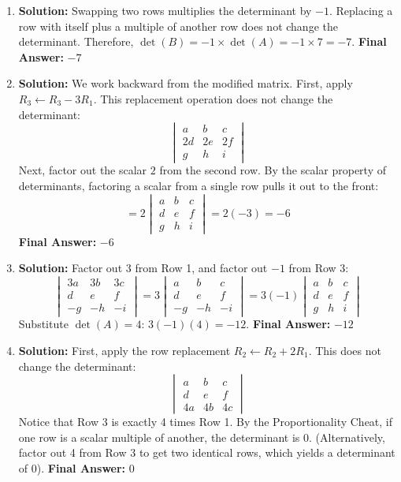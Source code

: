 \documentclass[11pt]{article}
\begin{document}
\begin{enumerate}
    \item \textbf{Solution:} Swapping two rows multiplies the determinant by $-1$. Replacing a row with itself plus a multiple of another row does not change the determinant.
    Therefore, $\det(B) = -1 \times \det(A) = -1 \times 7 = -7$.
    \textbf{Final Answer:} $-7$

    \item \textbf{Solution:} We work backward from the modified matrix.
    First, apply $R_3 \leftarrow R_3 - 3R_1$. This replacement operation does not change the determinant:
    \[ \begin{vmatrix} a & b & c \\ 2d & 2e & 2f \\ g & h & i \end{vmatrix} \]
    Next, factor out the scalar $2$ from the second row. By the scalar property of determinants, factoring a scalar from a single row pulls it out to the front:
    \[ = 2 \begin{vmatrix} a & b & c \\ d & e & f \\ g & h & i \end{vmatrix} = 2(-3) = -6 \]
    \textbf{Final Answer:} $-6$

    \item \textbf{Solution:} Factor out $3$ from Row 1, and factor out $-1$ from Row 3:
    \[ \begin{vmatrix} 3a & 3b & 3c \\ d & e & f \\ -g & -h & -i \end{vmatrix} = 3 \begin{vmatrix} a & b & c \\ d & e & f \\ -g & -h & -i \end{vmatrix} = 3(-1) \begin{vmatrix} a & b & c \\ d & e & f \\ g & h & i \end{vmatrix} \]
    Substitute $\det(A) = 4$: $3(-1)(4) = -12$.
    \textbf{Final Answer:} $-12$

    \item \textbf{Solution:} First, apply the row replacement $R_2 \leftarrow R_2 + 2R_1$. This does not change the determinant:
    \[ \begin{vmatrix} a & b & c \\ d & e & f \\ 4a & 4b & 4c \end{vmatrix} \]
    Notice that Row 3 is exactly 4 times Row 1. By the Proportionality Cheat, if one row is a scalar multiple of another, the determinant is $0$. (Alternatively, factor out 4 from Row 3 to get two identical rows, which yields a determinant of 0).
    \textbf{Final Answer:} $0$


\end{enumerate}
\end{document}
